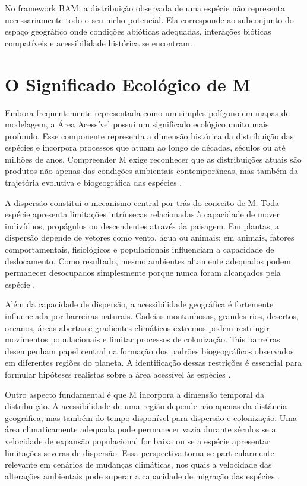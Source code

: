 \begin{conceptbox}
	No framework BAM, a distribuição observada de uma espécie não representa necessariamente todo o seu nicho potencial. Ela corresponde ao subconjunto do espaço geográfico onde condições abióticas adequadas, interações bióticas compatíveis e acessibilidade histórica se encontram.
\end{conceptbox}

\section{O Significado Ecológico de M}

Embora frequentemente representada como um simples polígono em mapas de modelagem, a Área Acessível possui um significado ecológico muito mais profundo. Esse componente representa a dimensão histórica da distribuição das espécies e incorpora processos que atuam ao longo de décadas, séculos ou até milhões de anos. Compreender M exige reconhecer que as distribuições atuais são produtos não apenas das condições ambientais contemporâneas, mas também da trajetória evolutiva e biogeográfica das espécies \parencite{Soberon2007,Peterson2011}.

A dispersão constitui o mecanismo central por trás do conceito de M. Toda espécie apresenta limitações intrínsecas relacionadas à capacidade de mover indivíduos, propágulos ou descendentes através da paisagem. Em plantas, a dispersão depende de vetores como vento, água ou animais; em animais, fatores comportamentais, fisiológicos e populacionais influenciam a capacidade de deslocamento. Como resultado, mesmo ambientes altamente adequados podem permanecer desocupados simplesmente porque nunca foram alcançados pela espécie \parencite{MacArthur1967,Peterson2011}.

Além da capacidade de dispersão, a acessibilidade geográfica é fortemente influenciada por barreiras naturais. Cadeias montanhosas, grandes rios, desertos, oceanos, áreas abertas e gradientes climáticos extremos podem restringir movimentos populacionais e limitar processos de colonização. Tais barreiras desempenham papel central na formação dos padrões biogeográficos observados em diferentes regiões do planeta. A identificação dessas restrições é essencial para formular hipóteses realistas sobre a área acessível às espécies \parencite{Peterson2011,Barve2011}.

Outro aspecto fundamental é que M incorpora a dimensão temporal da distribuição. A acessibilidade de uma região depende não apenas da distância geográfica, mas também do tempo disponível para dispersão e colonização. Uma área climaticamente adequada pode permanecer vazia durante séculos se a velocidade de expansão populacional for baixa ou se a espécie apresentar limitações severas de dispersão. Essa perspectiva torna-se particularmente relevante em cenários de mudanças climáticas, nos quais a velocidade das alterações ambientais pode superar a capacidade de migração das espécies \parencite{Thuiller2005,Zurell2020}.

